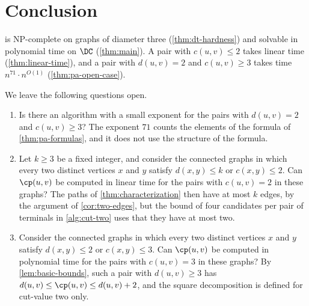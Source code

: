 \section{Conclusion}\label{sec:conclusion}

\MinCutPath{} is NP-complete on graphs of diameter three (\cref{thm:dt-hardness}) and solvable in polynomial time on $\DC$ (\cref{thm:main}).
A pair with $c(u, v) \leq 2$ takes linear time (\cref{thm:linear-time}), and a pair with $d(u, v) = 2$ and $c(u, v) \geq 3$ takes time $n^{71} \cdot n^{O(1)}$ (\cref{thm:pa-open-case}).

We leave the following questions open.
\begin{enumerate}
\item Is there an algorithm with a small exponent for the pairs with $d(u, v) = 2$ and $c(u, v) \geq 3$?
The exponent $71$ counts the elements of the formula of \cref{thm:pa-formulas}, and it does not use the structure of the formula.

\item Let $k \geq 3$ be a fixed integer, and consider the connected graphs in which every two distinct vertices $x$ and $y$ satisfy $d(x, y) \leq k$ or $c(x, y) \leq 2$.
Can $\cp(u, v)$ be computed in linear time for the pairs with $c(u, v) = 2$ in these graphs?
The paths of \cref{thm:characterization} then have at most $k$ edges, by the argument of \cref{cor:two-edges}, but the bound of four candidates per pair of terminals in \cref{alg:cut-two} uses that they have at most two.

\item Consider the connected graphs in which every two distinct vertices $x$ and $y$ satisfy $d(x, y) \leq 2$ or $c(x, y) \leq 3$.
Can $\cp(u, v)$ be computed in polynomial time for the pairs with $c(u, v) = 3$ in these graphs?
By \cref{lem:basic-bounds}, such a pair with $d(u, v) \geq 3$ has $d(u, v) \leq \cp(u, v) \leq d(u, v) + 2$, and the square decomposition is defined for cut-value two only.
\end{enumerate}
